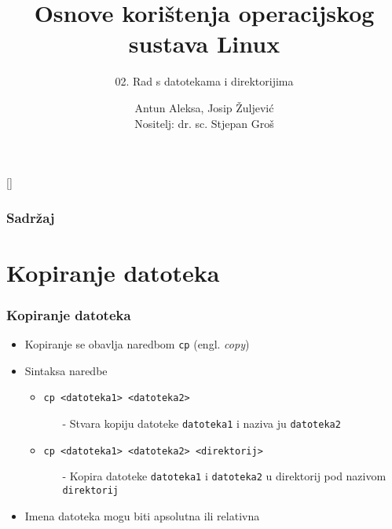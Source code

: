 \documentclass{beamer}
\title{Osnove korištenja operacijskog sustava Linux}
\subtitle{02. Rad s datotekama i direktorijima}
\author[Antun Aleksa, Josip Žuljević]{Antun Aleksa, Josip Žuljević\\{\small Nositelj: dr. sc. Stjepan Groš}}
\institute[FER]{Sveučilište u Zagrebu \\
				Fakultet elektrotehnike i računarstva}
\date{\todayiso}
\begin{document}
[]

\begin{frame}
\maketitle
\end{frame}

\begin{frame}
\frametitle{Sadržaj}
\tableofcontents
\end{frame}

\section{Kopiranje datoteka}
\begin{frame}[t]
\frametitle{Kopiranje datoteka}
\begin{itemize}
  \item Kopiranje se obavlja naredbom \texttt{cp} (engl. \emph{copy})
  \item Sintaksa naredbe
  \begin{itemize}
    \item \texttt{cp \textless datoteka1\textgreater
                     \textless datoteka2\textgreater}
    \begin{itemize}
      \item[-] Stvara kopiju datoteke \texttt{datoteka1} i naziva ju
               \texttt{datoteka2}
    \end{itemize}
    \item \texttt{cp \textless datoteka1\textgreater
                     \textless datoteka2\textgreater
                     \textless direktorij\textgreater}
    \begin{itemize}
      \item[-] Kopira datoteke \texttt{datoteka1} i \texttt{datoteka2} u
               direktorij pod nazivom \texttt{direktorij}
    \end{itemize}
  \end{itemize}
  \item Imena datoteka mogu biti apsolutna ili relativna
\end{itemize}
\end{frame}
\end{document}
